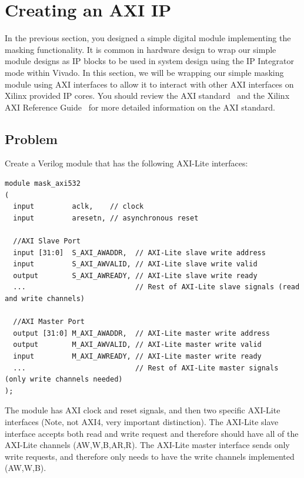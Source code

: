 \documentclass{article}
\begin{document}
\section{Creating an AXI IP}
\label{sec:mask_ip}
In the previous section, you designed a simple digital module implementing the masking functionality. It is common in hardware design to wrap our simple module designs as IP blocks to be used in system design using the IP Integrator mode within Vivado. In this section, we will be wrapping our simple masking module using AXI interfaces to allow it to interact with other AXI interfaces on Xilinx provided IP cores. You should review the AXI standard~\cite{ambaaxispec} and the Xilinx AXI Reference Guide~\cite{xilinxaxiref} for more detailed information on the AXI standard.

\subsection{Problem}
Create a Verilog module that has the following AXI-Lite interfaces:

\begin{verbatim}
module mask_axi532
(
  input         aclk,    // clock
  input         aresetn, // asynchronous reset
  
  //AXI Slave Port
  input [31:0]  S_AXI_AWADDR,  // AXI-Lite slave write address
  input         S_AXI_AWVALID, // AXI-Lite slave write valid
  output        S_AXI_AWREADY, // AXI-Lite slave write ready
  ...                          // Rest of AXI-Lite slave signals (read and write channels)
  
  //AXI Master Port
  output [31:0] M_AXI_AWADDR,  // AXI-Lite master write address
  output        M_AXI_AWVALID, // AXI-Lite master write valid
  input         M_AXI_AWREADY, // AXI-Lite master write ready
  ...                          // Rest of AXI-Lite master signals (only write channels needed)
);
\end{verbatim}

The module has AXI clock and reset signals, and then two specific AXI-Lite interfaces (Note, not AXI4, very important distinction). The AXI-Lite slave interface accepts both read and write request and therefore should have all of the AXI-Lite channels (AW,W,B,AR,R). The AXI-Lite master interface sends only write requests, and therefore only needs to have the write channels implemented (AW,W,B).
\end{document}

